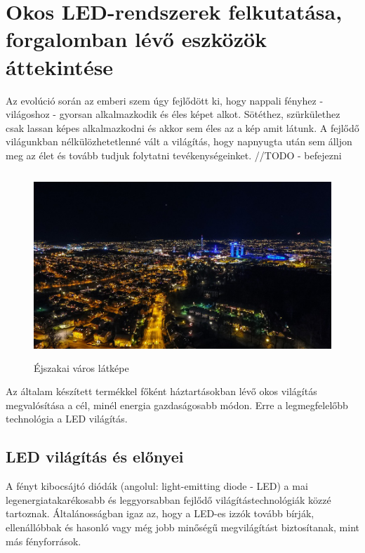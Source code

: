 \documentclass[../main.tex]{subfiles}
\begin{document}
\section{Okos LED-rendszerek felkutatása, forgalomban lévő eszközök áttekintése}
    Az evolúció során az emberi szem úgy fejlődött ki, hogy nappali fényhez - világoshoz - gyorsan alkalmazkodik és éles képet alkot. Sötéthez, szürkülethez csak lassan képes alkalmazkodni és akkor sem éles az a kép amit látunk. A fejlődő világunkban nélkülözhetetlenné vált a világítás, hogy napnyugta után sem álljon meg az élet és tovább tudjuk folytatni tevékenységeinket. //TODO - befejezni
    \begin{figure}[h!] %
        \centering
        \includegraphics[height=7cm]{irodalom_res/night_life.jpg}
        \caption{Éjszakai város látképe} %
    \end{figure}
    
    Az általam készített termékkel főként háztartásokban lévő okos világítás megvalósítása a cél, minél energia gazdaságosabb módon. Erre a legmegfelelőbb technológia a LED világítás.
    
    \subsection{LED világítás és előnyei} %
    
    A fényt kibocsájtó diódák (angolul: light-emitting diode - LED) a mai legenergiatakarékosabb és leggyorsabban fejlődő világítástechnológiák közzé tartoznak. Általánosságban igaz az, hogy a LED-es izzók tovább bírják, ellenállóbbak és hasonló vagy még jobb minőségű megvilágítást biztosítanak, mint más fényforrások.
    
\end{document}
